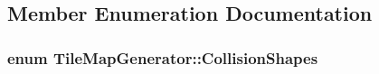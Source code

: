 \subsection{Member Enumeration Documentation}
\subsubsection[{\texorpdfstring{Collision\+Shapes}{CollisionShapes}}]{\setlength{\rightskip}{0pt plus 5cm}enum {\bf Tile\+Map\+Generator\+::\+Collision\+Shapes}\hspace{0.3cm}{\ttfamily [private]}}\hypertarget{classTileMapGenerator_adbe2ce45196adb0a3e09a215cc367480}{}\label{classTileMapGenerator_adbe2ce45196adb0a3e09a215cc367480}
